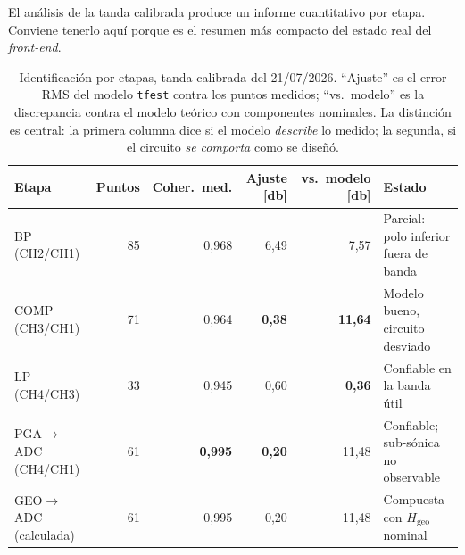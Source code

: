 El an\'alisis de la tanda calibrada produce un informe cuantitativo por etapa.
Conviene tenerlo aqu\'i porque es el resumen m\'as compacto del estado real del
\emph{front-end}.

\begin{table}[ht]
\centering\footnotesize
\caption{Identificaci\'on por etapas, tanda calibrada del 21/07/2026.
``Ajuste'' es el error RMS del modelo \texttt{tfest} contra los puntos medidos;
``vs.\ modelo'' es la discrepancia contra el modelo te\'orico con componentes
nominales. La distinci\'on es central: la primera columna dice si el modelo
\emph{describe} lo medido; la segunda, si el circuito \emph{se comporta} como se
dise\~n\'o.}
\label{tab:identificacion}
\begin{tabularx}{\textwidth}{@{}l r r r r X@{}}
\toprule
Etapa & Puntos & Coher.\ med. & Ajuste [\si{\decibel}] & vs.\ modelo [\si{\decibel}] & Estado \\
\midrule
BP (CH2/CH1)      & 85 & 0{,}968 & 6{,}49 & 7{,}57 & Parcial: polo inferior fuera de banda \\
COMP (CH3/CH1)    & 71 & 0{,}964 & \textbf{0{,}38} & \textbf{11{,}64} & Modelo bueno, circuito desviado \\
LP (CH4/CH3)      & 33 & 0{,}945 & 0{,}60 & \textbf{0{,}36} & Confiable en la banda \'util \\
PGA$\to$ADC (CH4/CH1) & 61 & \textbf{0{,}995} & \textbf{0{,}20} & 11{,}48 & Confiable; sub-s\'onica no observable \\
GEO$\to$ADC (calculada) & 61 & 0{,}995 & 0{,}20 & 11{,}48 & Compuesta con $H_{\text{geo}}$ nominal \\
\bottomrule
\end{tabularx}
\end{table}



